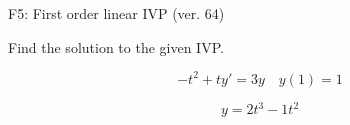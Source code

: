 \begin{exercise}
  \begin{exerciseTitle}F5: First order linear IVP (ver. 64)\end{exerciseTitle}
  \begin{exerciseStatement}
    
Find the solution to the given IVP.

    
\[-t^{2} +ty'= 3 y \hspace{1em} y( 1 ) = 1\]

  \end{exerciseStatement}
  \begin{exerciseAnswer}
    
\[y= 2 t^ 3 -1 t^{2}\]

  \end{exerciseAnswer}
\end{exercise}